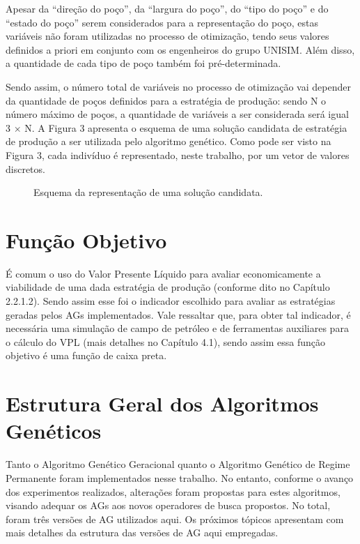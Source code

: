Apesar da “direção do poço”, da “largura do poço”, do “tipo do poço” e do “estado do poço” serem considerados para a representação do poço, estas variáveis não foram utilizadas no processo de otimização, tendo seus valores definidos a priori em conjunto com os engenheiros do grupo UNISIM. Além disso, a quantidade de cada tipo de poço também foi pré-determinada. 

Sendo assim, o número total de variáveis no processo de otimização vai depender da quantidade de poços definidos para a estratégia de produção: sendo N o número máximo de poços, a quantidade de variáveis a ser considerada será igual 3 $\times$ N. A Figura 3 apresenta o esquema de uma solução candidata de estratégia de produção a ser utilizada pelo algoritmo genético. Como pode ser visto na Figura 3, cada indivíduo é representado, neste trabalho, por um vetor de valores discretos.

\begin{figure}[htb]

\caption{Esquema da representação de uma solução candidata.}

\end{figure}

\section{Função Objetivo}

É comum o uso do Valor Presente Líquido para avaliar economicamente a viabilidade de uma dada estratégia de produção (conforme dito no Capítulo 2.2.1.2). Sendo assim esse foi o indicador escolhido para avaliar as estratégias geradas pelos AGs implementados. Vale ressaltar que, para obter tal indicador, é necessária uma simulação de campo de petróleo e de ferramentas auxiliares para o cálculo do VPL (mais detalhes no Capítulo 4.1), sendo assim essa função objetivo é uma função de caixa preta. 

\section{Estrutura Geral dos Algoritmos Genéticos}

Tanto o Algoritmo Genético Geracional quanto o Algoritmo Genético de Regime Permanente foram implementados nesse trabalho. No entanto, conforme o avanço dos experimentos realizados, alterações foram propostas para estes algoritmos, visando adequar os AGs aos novos operadores de busca propostos.  No total, foram três versões de AG utilizados aqui.  Os próximos tópicos apresentam com mais detalhes da estrutura das versões de AG aqui empregadas.

